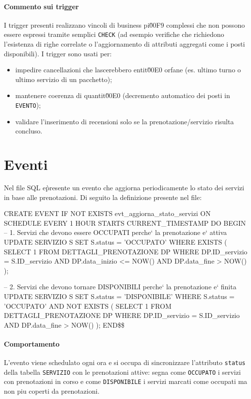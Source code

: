 \documentclass[a4paper,12pt]{report}
\begin{document}
\paragraph{Commento sui trigger}
I trigger presenti realizzano vincoli di business pi\u00F9 complessi che non possono essere espressi tramite semplici \texttt{CHECK} (ad esempio verifiche che richiedono l'esistenza di righe correlate o l'aggiornamento di attributi aggregati come i posti disponibili). I trigger sono usati per:
\begin{itemize}
\item impedire cancellazioni che lascerebbero entit\u00E0 orfane (es. ultimo turno o ultimo servizio di un pacchetto);
\item mantenere coerenza di quantit\u00E0 (decremento automatico dei posti in \texttt{EVENTO});
\item validare l'inserimento di recensioni solo se la prenotazione/servizio risulta concluso.
\end{itemize}

\section{Eventi}
Nel file SQL e\` presente un evento che aggiorna periodicamente lo stato dei servizi in base alle prenotazioni. Di seguito la definizione presente nel file:

\begin{sqlcode}[caption={EVENTI},label={lst:eventi}]

CREATE EVENT IF NOT EXISTS evt_aggiorna_stato_servizi
ON SCHEDULE EVERY 1 HOUR
STARTS CURRENT_TIMESTAMP
DO
BEGIN
    -- 1. Servizi che devono essere OCCUPATI perche` la prenotazione  e` attiva
    UPDATE SERVIZIO S
    SET S.status = 'OCCUPATO'
    WHERE EXISTS (
        SELECT 1
        FROM DETTAGLI_PRENOTAZIONE DP
        WHERE DP.ID_servizio = S.ID_servizio
        AND DP.data_inizio <= NOW()
        AND DP.data_fine > NOW()
    );
    
    -- 2. Servizi che devono tornare DISPONIBILI perche` la prenotazione  e` finita
    UPDATE SERVIZIO S
    SET S.status = 'DISPONIBILE'
    WHERE S.status = 'OCCUPATO'
      AND NOT EXISTS (
          SELECT 1
          FROM DETTAGLI_PRENOTAZIONE DP
          WHERE DP.ID_servizio = S.ID_servizio
            AND DP.data_fine > NOW()
      );
END\$\$
\end{sqlcode}

\paragraph{Comportamento}
L'evento viene schedulato ogni ora e si occupa di sincronizzare l'attributo \texttt{status} della tabella \texttt{SERVIZIO} con le prenotazioni attive: segna come \texttt{OCCUPATO} i servizi con prenotazioni in corso e come \texttt{DISPONIBILE} i servizi marcati come occupati ma non piu coperti da prenotazioni.
\end{document}
